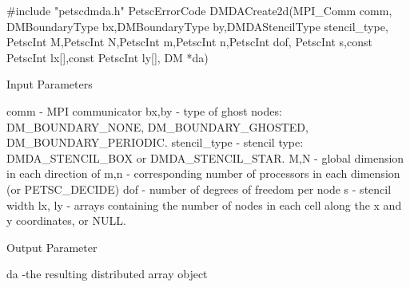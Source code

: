 #include "petscdmda.h"
PetscErrorCode  DMDACreate2d(MPI_Comm comm,
    DMBoundaryType bx,DMBoundaryType by,DMDAStencilType stencil_type,
    PetscInt M,PetscInt N,PetscInt m,PetscInt n,PetscInt dof,
    PetscInt s,const PetscInt lx[],const PetscInt ly[],
    DM *da)

Input Parameters

comm - MPI communicator
bx,by - type of ghost nodes: DM_BOUNDARY_NONE, DM_BOUNDARY_GHOSTED, DM_BOUNDARY_PERIODIC.
stencil_type - stencil type: DMDA_STENCIL_BOX or DMDA_STENCIL_STAR.
M,N - global dimension in each direction of
m,n - corresponding number of processors in each dimension (or PETSC_DECIDE)
dof - number of degrees of freedom per node
s - stencil width
lx, ly - arrays containing the number of
    nodes in each cell along the x and y coordinates, or NULL.

Output Parameter

da  -the resulting distributed array object
